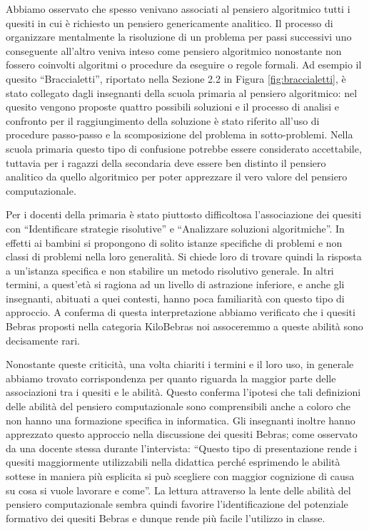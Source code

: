 \documentclass[12pt]{report}
\begin{document}
Abbiamo osservato che spesso venivano associati al pensiero algoritmico tutti i quesiti in cui è richiesto un pensiero genericamente analitico. Il processo di organizzare mentalmente la risoluzione di un problema per passi successivi uno conseguente all'altro veniva inteso come pensiero algoritmico nonostante non fossero coinvolti algoritmi o procedure da eseguire o regole formali. Ad esempio il quesito ``Braccialetti'', riportato nella Sezione 2.2 in Figura \ref{fig:braccialetti}, è stato collegato dagli insegnanti della scuola primaria al pensiero algoritmico: nel quesito vengono proposte quattro possibili soluzioni e il processo di analisi e confronto per il raggiungimento della soluzione è stato riferito all'uso di procedure passo-passo e la scomposizione del problema in sotto-problemi. Nella scuola primaria questo tipo di confusione potrebbe essere considerato accettabile, tuttavia per i ragazzi della secondaria deve essere ben distinto il pensiero analitico da quello algoritmico per poter apprezzare il vero valore del pensiero computazionale.


Per i docenti della primaria è stato piuttosto difficoltosa l'associazione dei quesiti con ``Identificare strategie risolutive'' e ``Analizzare soluzioni algoritmiche''. In effetti ai bambini si propongono di solito istanze specifiche di problemi e non classi di problemi nella loro generalità. Si chiede loro di trovare quindi la risposta a un'istanza specifica e non stabilire un metodo risolutivo generale. In altri termini, a quest'età si ragiona ad un livello di astrazione inferiore, e anche gli insegnanti, abituati a quei contesti, hanno poca familiarità con questo tipo di approccio. A conferma di questa interpretazione abbiamo verificato che i quesiti Bebras proposti nella categoria KiloBebras noi assoceremmo a queste abilità sono decisamente rari.



Nonostante queste criticità, una volta chiariti i termini e il loro uso, in generale abbiamo trovato corrispondenza per quanto riguarda la maggior parte delle associazioni tra i quesiti e le abilità. Questo conferma l'ipotesi che tali definizioni delle abilità del pensiero computazionale sono comprensibili anche a coloro che non hanno una formazione specifica in informatica. Gli insegnanti inoltre hanno apprezzato questo approccio nella discussione dei quesiti Bebras; come osservato da una docente stessa durante l'intervista: ``Questo tipo di presentazione rende i quesiti maggiormente utilizzabili nella didattica perché esprimendo le abilità sottese in maniera più esplicita si può scegliere con maggior cognizione di causa su cosa si vuole lavorare e come''.
La lettura attraverso la lente delle abilità del pensiero computazionale sembra quindi favorire l'identificazione del potenziale formativo dei quesiti Bebras e dunque rende più facile l'utilizzo in classe.
\end{document}
